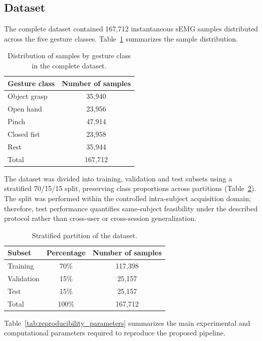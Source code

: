 \documentclass[technologies,article,submit,pdftex,moreauthors]{Definitions/mdpi}
\begin{document}
\subsection{Dataset}

The complete dataset contained 167,712 instantaneous sEMG samples distributed across the five gesture classes. Table~\ref{tab:class_distribution} summarizes the sample distribution.

\begin{table}[H]
\centering
\caption{Distribution of samples by gesture class in the complete dataset.\label{tab:class_distribution}}
\begin{tabular}{lc}
\toprule
\textbf{Gesture class} & \textbf{Number of samples} \\
\midrule
Object grasp & 35,940 \\
Open hand & 23,956 \\
Pinch & 47,914 \\
Closed fist & 23,958 \\
Rest & 35,944 \\
\midrule
Total & 167,712 \\
\bottomrule
\end{tabular}
\end{table}

The dataset was divided into training, validation and test subsets using a stratified 70/15/15 split, preserving class proportions across partitions (Table~\ref{tab:split_distribution}).
The split was performed within the controlled intra-subject acquisition domain; therefore, test performance quantifies same-subject feasibility under the described protocol rather than cross-user or cross-session generalization.

\begin{table}[H]
\centering
\caption{Stratified partition of the dataset.\label{tab:split_distribution}}
\begin{tabular}{lcc}
\toprule
\textbf{Subset} & \textbf{Percentage} & \textbf{Number of samples} \\
\midrule
Training & 70\% & 117,398 \\
Validation & 15\% & 25,157 \\
Test & 15\% & 25,157 \\
\midrule
Total & 100\% & 167,712 \\
\bottomrule
\end{tabular}
\end{table}

Table~\ref{tab:reproducibility_parameters} summarizes the main experimental and computational parameters required to reproduce the proposed pipeline.
\end{document}
